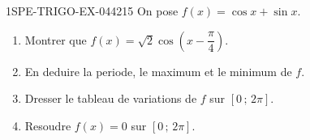 \begin{exercice}{1SPE-TRIGO-EX-044}{2}{15}
On pose $f(x) = \cos x + \sin x$.
\begin{enumerate}
  \item Montrer que $f(x) = \sqrt{2}\cos\!\left(x - \dfrac{\pi}{4}\right)$.
  \item En deduire la periode, le maximum et le minimum de $f$.
  \item Dresser le tableau de variations de $f$ sur $[0\,;\,2\pi]$.
  \item Resoudre $f(x) = 0$ sur $[0\,;\,2\pi]$.
\end{enumerate}
\end{exercice}
